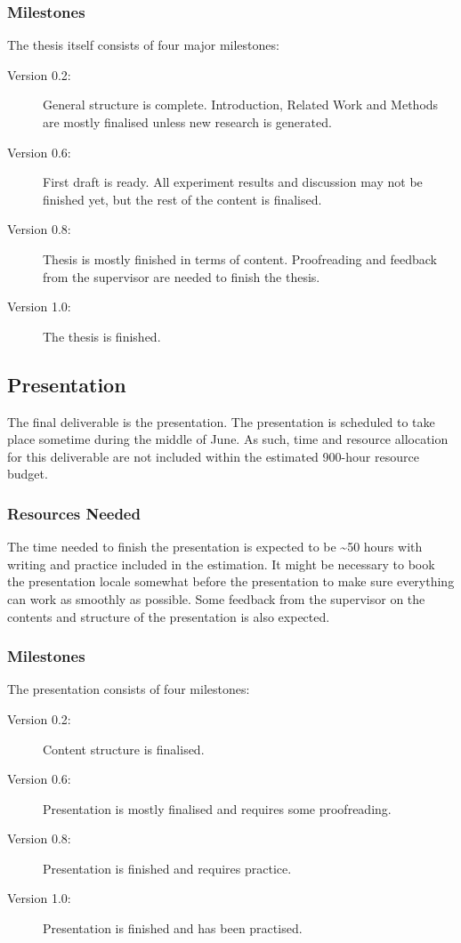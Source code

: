 \subsubsection{Milestones}
The thesis itself consists of four major milestones:

\begin{description}
\item[Version 0.2: ] General structure is complete. Introduction, Related Work and Methods are mostly finalised unless new research is generated.
\item[Version 0.6: ] First draft is ready. All experiment results and discussion may not be finished yet, but the rest of the content is finalised. 
\item[Version 0.8: ] Thesis is mostly finished in terms of content. Proofreading and feedback from the supervisor are needed to finish the thesis. 
\item[Version 1.0: ] The thesis is finished.
\end{description}

\subsection{Presentation}
The final deliverable is the presentation. The presentation is scheduled to take place sometime during the middle of June. As such, time and resource allocation for this deliverable are not included within the estimated 900-hour resource budget. 
\subsubsection{Resources Needed}
The time needed to finish the presentation is expected to be \textasciitilde 50 hours with writing and practice included in the estimation. It might be necessary to book the presentation locale somewhat before the presentation to make sure everything can work as smoothly as possible. Some feedback from the supervisor on the contents and structure of the presentation is also expected.

\subsubsection{Milestones}
The presentation consists of four milestones:
\begin{description}
\item[Version 0.2: ] Content structure is finalised. 
\item[Version 0.6: ] Presentation is mostly finalised and requires some proofreading.  
\item[Version 0.8: ] Presentation is finished and requires practice. 
\item[Version 1.0: ] Presentation is finished and has been practised.
\end{description}

